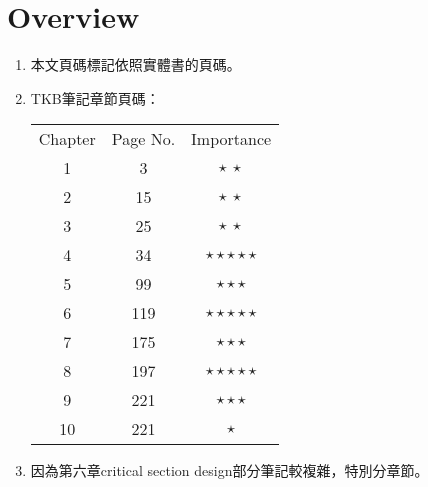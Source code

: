 \section{Overview}

\begin{enumerate}
    \item 本文頁碼標記依照實體書\cite{1}的頁碼。
    \item TKB筆記\cite{2}章節頁碼：
    \begin{table}[H]
        \centering
        \begin{tabular}{|c|c|c|}
            \hline
            Chapter & Page No. & Importance \\
            \Xhline{2\arrayrulewidth}
            1 & 3 & $\star \ \star$ \\
            \hline
            2 & 15 & $\star \ \star$ \\
            \hline
            3 & 25 & $\star \ \star$ \\
            \hline
            4 & 34 & $\star\star\star\star\star$ \\
            \hline
            5 & 99 & $\star\star\star$ \\
            \hline
            6 & 119 & $\star\star\star\star\star$ \\
            \hline
            7 & 175 & $\star\star\star$ \\
            \hline
            8 & 197 & $\star\star\star\star\star$ \\
            \hline
            9 & 221 & $\star\star\star$ \\
            \hline
            10 & 221 & $\star$ \\
            \hline
        \end{tabular}
    \end{table}
    \item 因為第六章critical section design部分筆記較複雜，特別分章節。
\end{enumerate}

\pagebreak